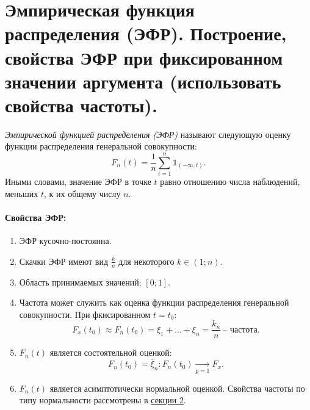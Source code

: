 \section{Эмпирическая функция распределения (ЭФР). Построение, свойства ЭФР при
фиксированном значении аргумента (использовать свойства частоты).}

\begin{definition}
    \textit{Эмпирической функцией распределения (ЭФР)} называют следующую оценку
    функции распределения генеральной совокупности:
    \[
        F_n(t) = \frac{1}{n} \sum_{i = 1}^{n} \mathbb{1}_{(-\infty, t)}
    .\]
    Иными словами, значение ЭФР в точке $t$ равно отношению числа наблюдений,
    меньших $t$, к их общему числу $n$.
\end{definition}

\paragraph{Свойства ЭФР:}

\begin{enumerate}
    \item ЭФР кусочно-постоянна.
    \item Скачки ЭФР имеют вид $\frac{k}{n}$ для некоторого $k \in (1; n)$.
    \item Область принимаемых значений: $[0; 1]$.
    \item Частота может служить как оценка функции распределения генеральной
        совокупности. При фкисированном $t = t_0$:
        \[
            F_x(t_0) \approx F_n(t_0) = \xi_1 + \ldots + \xi_n =
            \frac{k_n}{n}~ \text{-- частота}
        .\]
    \item $F_n(t)$ является состоятельной оценкой:
        \[
            F_n(t_0) = \overline{\xi}_n: F_n(t_0) \xrightarrow[p = 1]{} F_x
        .\]
    \item $F_n(t)$ является асимптотически нормальной оценкой. Свойства частоты
    по типу нормальности рассмотрены в \hyperref[sec:normfreq]{секции 2}.
\end{enumerate}
